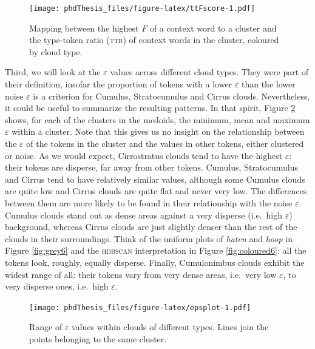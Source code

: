 \documentclass[
]{book}
\begin{document}
\begin{figure}
\centering
\texttt{[image: phdThesis\_files/figure-latex/ttFscore-1.pdf]}
\caption{\label{fig:ttFscore}Mapping between the highest \(F\) of a context word to a cluster and the type-token ratio (\textsc{ttr}) of context words in the cluster, coloured by cloud type.}
\end{figure}

Third, we will look at the \(\varepsilon\) values across different cloud types. They were part of their definition, insofar the proportion of tokens with a lower \(\varepsilon\) than the lower noise \(\varepsilon\) is a criterion for Cumulus, Stratocumulus and Cirrus clouds. Nevertheless, it could be useful to summarize the resulting patterns. In that spirit, Figure \ref{fig:epsplot} shows, for each of the clusters in the medoids, the minimum, mean and maximum \(\varepsilon\) within a cluster. Note that this gives us no insight on the relationship between the \(\varepsilon\) of the tokens in the cluster and the values in other tokens, either clustered or noise.
As we would expect, Cirrostratus clouds tend to have the highest \(\varepsilon\): their tokens are disperse, far away from other tokens. Cumulus, Stratocumulus and Cirrus tend to have relatively similar values, although some Cumulus clouds are quite low and Cirrus clouds are quite flat and never very low. The differences between them are more likely to be found in their relationship with the noise \(\varepsilon\). Cumulus clouds stand out as dense areas against a very disperse (i.e.~high \(\varepsilon\)) background, whereas Cirrus clouds are just slightly denser than the rest of the clouds in their surroundings. Think of the uniform plots of \emph{haten} and \emph{hoop} in Figure \ref{fig:grey6} and the \textsc{hdbscan} interpretation in Figure \ref{fig:coloured6}: all the tokens look, roughly, equally disperse. Finally, Cumulonimbus clouds exhibit the widest range of all: their tokens vary from very dense areas, i.e.~very low \(\varepsilon\), to very disperse ones, i.e.~high \(\varepsilon\).



\begin{figure}
\centering
\texttt{[image: phdThesis\_files/figure-latex/epsplot-1.pdf]}
\caption{\label{fig:epsplot}Range of \(\varepsilon\) values within clouds of different types. Lines join the points belonging to the same cluster.}
\end{figure}
\end{document}
